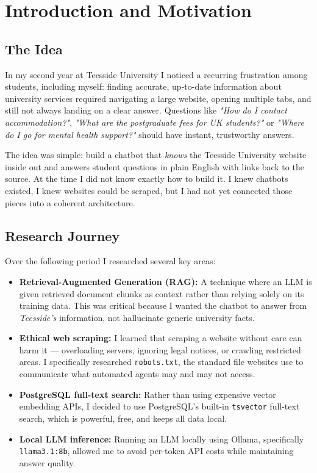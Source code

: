 \documentclass[12pt,a4paper]{report}
\begin{document}
\tableofcontents
\newpage

\chapter{Introduction and Motivation}

\section{The Idea}

In my second year at Teesside University I noticed a recurring frustration among students, including myself: finding accurate, up-to-date information about university services required navigating a large website, opening multiple tabs, and still not always landing on a clear answer. Questions like \textit{"How do I contact accommodation?"}, \textit{"What are the postgraduate fees for UK students?"} or \textit{"Where do I go for mental health support?"} should have instant, trustworthy answers.

The idea was simple: build a chatbot that \emph{knows} the Teesside University website inside out and answers student questions in plain English with links back to the source. At the time I did not know exactly how to build it. I knew chatbots existed, I knew websites could be scraped, but I had not yet connected those pieces into a coherent architecture.

\section{Research Journey}

Over the following period I researched several key areas:

\begin{itemize}
    \item \textbf{Retrieval-Augmented Generation (RAG):} A technique where an LLM is given retrieved document chunks as context rather than relying solely on its training data. This was critical because I wanted the chatbot to answer from \emph{Teesside's} information, not hallucinate generic university facts.
    \item \textbf{Ethical web scraping:} I learned that scraping a website without care can harm it --- overloading servers, ignoring legal notices, or crawling restricted areas. I specifically researched \texttt{robots.txt}, the standard file websites use to communicate what automated agents may and may not access.
    \item \textbf{PostgreSQL full-text search:} Rather than using expensive vector embedding APIs, I decided to use PostgreSQL's built-in \texttt{tsvector} full-text search, which is powerful, free, and keeps all data local.
    \item \textbf{Local LLM inference:} Running an LLM locally using Ollama, specifically \texttt{llama3.1:8b}, allowed me to avoid per-token API costs while maintaining answer quality.
\end{itemize}
\end{document}
